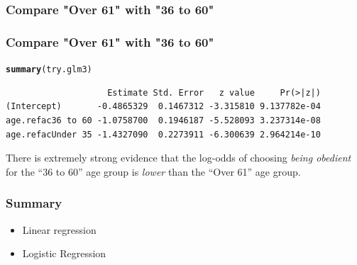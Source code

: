 \documentclass{beamer}\usepackage[]{graphicx}\usepackage[]{color}
\makeatletter
\newcommand{\hlstr}[1]{\textcolor[rgb]{0.192,0.494,0.8}{#1}}%
\newcommand{\hlopt}[1]{\textcolor[rgb]{0,0,0}{#1}}%
\newcommand{\hlstd}[1]{\textcolor[rgb]{0.345,0.345,0.345}{#1}}%
\newcommand{\hlkwb}[1]{\textcolor[rgb]{0.69,0.353,0.396}{#1}}%
\newcommand{\hlkwc}[1]{\textcolor[rgb]{0.333,0.667,0.333}{#1}}%
\newcommand{\hlkwd}[1]{\textcolor[rgb]{0.737,0.353,0.396}{\textbf{#1}}}%
\newenvironment{kframe}{%
 \def\at@end@of@kframe{}%
 \ifinner\ifhmode%
  \def\at@end@of@kframe{\end{minipage}}%
  \begin{minipage}{\columnwidth}%
 \fi\fi%
 \def\FrameCommand##1{\hskip\@totalleftmargin \hskip-\fboxsep
 \colorbox{shadecolor}{##1}\hskip-\fboxsep
     \hskip-\linewidth \hskip-\@totalleftmargin \hskip\columnwidth}%
 \MakeFramed {\advance\hsize-\width
   \@totalleftmargin\z@ \linewidth\hsize
   \@setminipage}}%
 {\par\unskip\endMakeFramed%
 \at@end@of@kframe}
\newenvironment{knitrout}{}{} %
\makeatother
\begin{document}
\begin{frame}[fragile]
\frametitle{Compare "Over 61" with "36 to 60"}
\end{frame}

\begin{frame}[fragile]
\frametitle{Compare "Over 61" with "36 to 60"}
\begin{knitrout}
\color{fgcolor}\begin{kframe}
\begin{alltt}
\hlkwd{summary}\hlstd{(try.glm3)}
\end{alltt}
\end{kframe}
\end{knitrout}
\begin{knitrout}\small
{}\color{fgcolor}\begin{kframe}
\begin{verbatim}
                    Estimate Std. Error   z value     Pr(>|z|)
(Intercept)       -0.4865329  0.1467312 -3.315810 9.137782e-04
age.refac36 to 60 -1.0758700  0.1946187 -5.528093 3.237314e-08
age.refacUnder 35 -1.4327090  0.2273911 -6.300639 2.964214e-10
\end{verbatim}
\end{kframe}
\end{knitrout}
There is extremely strong evidence that the log-odds of choosing {\em being obedient} for the ``36 to 60'' age group is \emph{lower} than the ``Over 61'' age group.
\end{frame}

\begin{frame}[fragile]
  \frametitle{Summary}
  \begin{itemize}
  \item Linear regression
  \item Logistic Regression
  \end{itemize}
\end{frame}
\end{document}
